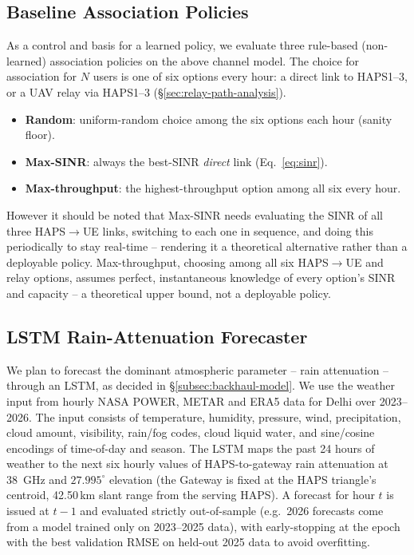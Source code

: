 \documentclass[]{ieeeaccess}
\begin{document}
\subsection{Baseline Association Policies}
\label{sec:baseline-policies}

As a control and basis for a learned policy, we evaluate three rule-based (non-learned) association policies on the above channel model. The choice for association for $N$ users is one of six options every hour: a direct link to HAPS1--3, or a UAV relay via HAPS1--3 (\S\ref{sec:relay-path-analysis}).

\begin{itemize}\setlength{\itemsep}{1pt}
  \item \textbf{Random}: uniform-random choice among the six options each hour (sanity floor).
  \item \textbf{Max-SINR}: always the best-SINR \emph{direct} link (Eq.~\eqref{eq:sinr}).
  \item \textbf{Max-throughput}: the highest-throughput option among all six every hour.
\end{itemize}

However it should be noted that Max-SINR needs evaluating the SINR of all three HAPS$\to$UE links, switching to each one in sequence, and doing this periodically to stay real-time -- rendering it a theoretical alternative rather than a deployable policy. Max-throughput, choosing among all six HAPS$\to$UE and relay options, assumes perfect, instantaneous knowledge of every option's SINR and capacity -- a theoretical upper bound, not a deployable policy.

\subsection{LSTM Rain-Attenuation Forecaster}
\label{sec:lstm}

We plan to forecast the dominant atmospheric parameter -- rain attenuation -- through an LSTM, as decided in \S\ref{subsec:backhaul-model}. We use the weather input from hourly NASA POWER, METAR and ERA5 data for Delhi over 2023--2026. The input consists of temperature, humidity, pressure, wind, precipitation, cloud amount, visibility, rain/fog codes, cloud liquid water, and sine/cosine encodings of time-of-day and season. The LSTM maps the past 24 hours of weather to the next six hourly values of HAPS-to-gateway rain attenuation at 38~GHz and $27.995^\circ$ elevation (the Gateway is fixed at the HAPS triangle's centroid, 42.50\,km slant range from the serving HAPS). A forecast for hour $t$ is issued at $t-1$ and evaluated strictly out-of-sample (e.g.\ 2026 forecasts come from a model trained only on 2023--2025 data), with early-stopping at the epoch with the best validation RMSE on held-out 2025 data to avoid overfitting.
\end{document}
